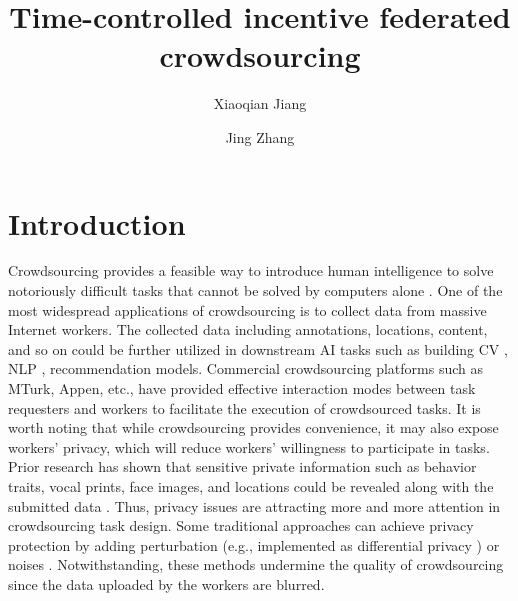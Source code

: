 \documentclass[final,1p,times]{elsarticle}
\begin{document}
	
\begin{frontmatter}
		
\title{Time-controlled incentive federated crowdsourcing}
		

\author[mymainaddress]{Xiaoqian Jiang }
		
\author[mymainaddress]{Jing Zhang
}
		
		
\address[mymainaddress]{School of Cyber Science and Engineering, Southeast University, No. 2 SEU Road, Nanjing 211189, China}
		
\begin{abstract}
			
\end{abstract}
\begin{keyword}
	
\end{keyword}
\end{frontmatter}

\section{Introduction}
Crowdsourcing provides a feasible way to introduce human intelligence to solve notoriously difficult tasks that cannot be solved by computers alone \citep{Vaughan2017MakingBU}. One of the most widespread applications of crowdsourcing is to collect data from massive Internet workers. The collected data including annotations, locations, content, and so on could be further utilized in downstream AI tasks such as building CV \citep{Kovashka2016CrowdsourcingIC}, NLP \citep{Wang2013PerspectivesOC}, recommendation \citep{Lin2023CompetitiveGI} models. Commercial crowdsourcing platforms such as MTurk, Appen, etc., have provided effective interaction modes between task requesters and workers to facilitate the execution of crowdsourced tasks. It is worth noting that while crowdsourcing provides convenience, it may also expose workers' privacy, which will reduce workers' willingness to participate in tasks. Prior research has shown that sensitive private information such as behavior traits, vocal prints, face images, and locations could be revealed along with the submitted data \citep{xia2020privacy,Tong2020FederatedLI}. Thus, privacy issues are attracting more and more attention in crowdsourcing task design. Some traditional approaches can achieve privacy protection by adding perturbation (e.g., implemented as differential privacy \citep{luo2016incentive,wang2022pps}) or noises \citep{to2018ppo,huang2020traffic}. Notwithstanding, these methods undermine the quality of crowdsourcing since the data uploaded by the workers are blurred.
\end{document}
